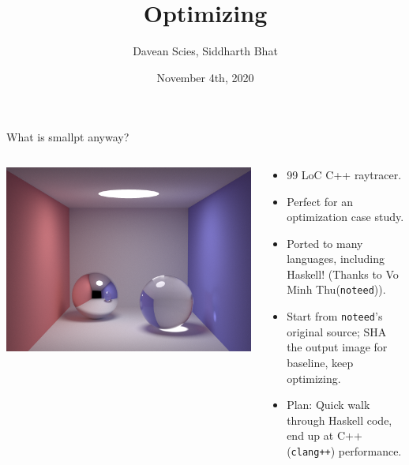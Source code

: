 \documentclass[8pt]{beamer}
\author{Davean Scies, Siddharth Bhat}
\date{November 4th, 2020}
\institute{Haskell Exchange}
\title{Optimizing \smallpt}
\begin{document}
\maketitle

\begin{frame}[fragile]{What is smallpt anyway?}
\pause
\begin{columns}
\begin{column}{0.48\textwidth}
\includegraphics[height=0.8\textwidth]{./smallpt-render.png}
\end{column}
\begin{column}{0.48\textwidth}
\begin{itemize}
\item 99 LoC C++ raytracer.
\item Perfect for an optimization case study.
\item Ported to many languages, including Haskell! (Thanks to Vo Minh Thu(\texttt{noteed})).
\item Start from \texttt{noteed}'s original source; SHA the output image for baseline,
      keep optimizing.
\item Plan: Quick walk through Haskell code, end up at C++ (\texttt{clang++}) performance.
\end{itemize}
\end{column}
\end{columns}
\end{frame}

\end{document}
